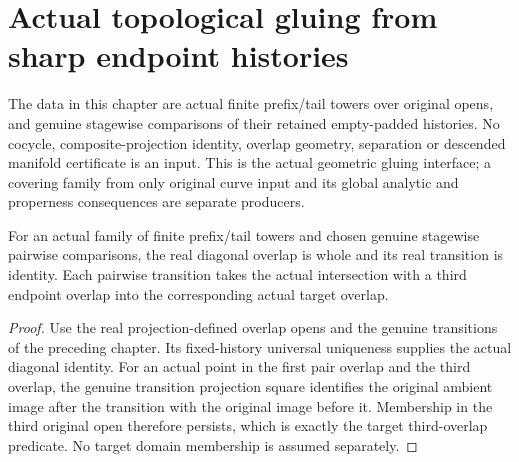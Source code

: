 \section{Actual topological gluing from sharp endpoint histories}

The data in this chapter are actual finite prefix/tail towers over original
opens, and genuine stagewise comparisons of their retained empty-padded
histories. No cocycle, composite-projection identity, overlap geometry,
separation or descended manifold certificate is an input. This is the actual
geometric gluing interface; a covering family from only original curve input
and its global analytic and properness consequences are separate producers.

\begin{lemma}
\label{hir:sharp-actual-endpoint-transition-intersection}
\leanok
{}
For an actual family of finite prefix/tail towers and chosen genuine stagewise
pairwise comparisons, the real diagonal overlap is whole and its real
transition is identity. Each pairwise transition takes the actual intersection
with a third endpoint overlap into the corresponding actual target overlap.
\end{lemma}
\begin{proof}
Use the real projection-defined overlap opens and the genuine transitions of
the preceding chapter. Its fixed-history universal uniqueness supplies the
actual diagonal identity. For an actual point in the first pair overlap and
the third overlap, the genuine transition projection square identifies the
original ambient image after the transition with the original image before
it. Membership in the third original open therefore persists, which is
exactly the target third-overlap predicate. No target domain membership is
assumed separately.
\end{proof}


